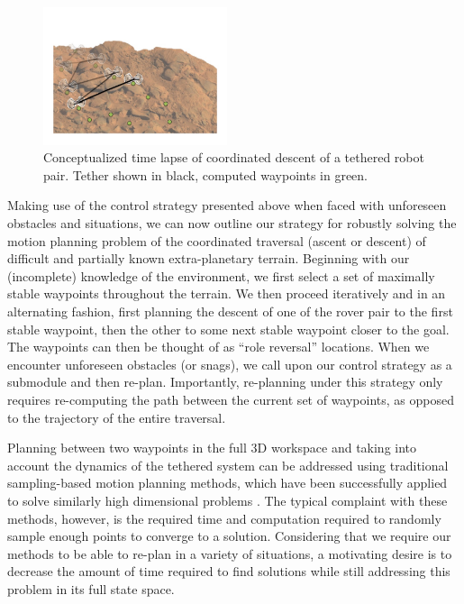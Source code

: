 \documentclass[12pt]{article}
\begin{document}
\begin{figure}
  \begin{center}
	\vspace{-0.4in}	
	\includegraphics[width=0.48\textwidth, left]{descent.jpg}
  \end{center}
  \vspace{-0.2in}
  \label{fig:descent}
  \caption{Conceptualized time lapse of coordinated descent of a tethered robot pair. Tether shown in black, computed 
  waypoints in green.}
\end{figure}
Making use of the control strategy presented above when faced with unforeseen obstacles and situations, 
we can now outline our strategy for robustly
solving the motion planning problem of the coordinated traversal (ascent or descent) of difficult and partially known 
extra-planetary terrain. Beginning with our (incomplete) knowledge of the environment, we first select a set of maximally stable waypoints 
throughout the terrain. We then proceed iteratively and in an alternating fashion, first planning the descent of one of the rover
pair to the first stable waypoint, 
then the other to some next stable waypoint closer to the goal. The waypoints can then be thought of as ``role reversal''
locations. When we encounter unforeseen obstacles (or snags), we call upon our control strategy as a submodule and then re-plan. 
Importantly, re-planning under this strategy only requires re-computing 
the path between the current set of waypoints, as opposed to the trajectory of the entire traversal. 

Planning between two waypoints in the full 3D workspace and taking into account the dynamics of the tethered system can be 
addressed using traditional sampling-based motion planning methods, which have been successfully applied to solve similarly 
high dimensional problems \cite{zak_kino}. The typical complaint with these methods, however, is the required time and 
computation required to randomly sample enough points to converge to a solution. Considering that we require our 
methods to be able to re-plan in a variety of situations, a motivating desire is to decrease the amount of time 
required to find solutions while still addressing this problem in its full state space. 
\end{document}
